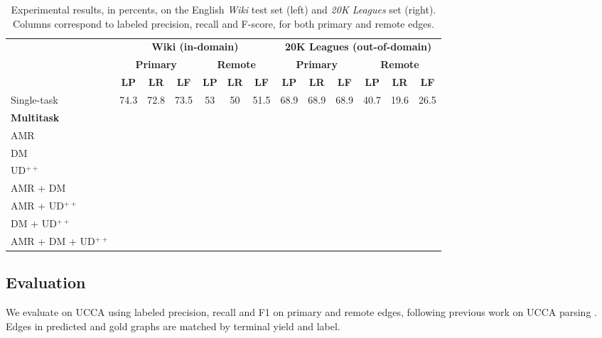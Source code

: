 \documentclass[11pt,a4paper]{article}
\begin{document}
\begin{table*}
\centering
\begin{tabular}{l|ccc|ccc||ccc|ccc}
& \multicolumn{6}{c||}{\footnotesize \bf Wiki (in-domain)}
& \multicolumn{6}{c}{\footnotesize \bf 20K Leagues (out-of-domain)} \\
& \multicolumn{3}{c|}{\footnotesize \bf Primary} & \multicolumn{3}{c||}{\footnotesize \bf Remote}
& \multicolumn{3}{c|}{\footnotesize \bf Primary} & \multicolumn{3}{c}{\footnotesize \bf Remote} \\
& \footnotesize \textbf{LP} & \footnotesize \textbf{LR} & \footnotesize \textbf{LF}
& \footnotesize \textbf{LP} & \footnotesize \textbf{LR} & \footnotesize \textbf{LF}
& \footnotesize \textbf{LP} & \footnotesize \textbf{LR} & \footnotesize \textbf{LF}
& \footnotesize \textbf{LP} & \footnotesize \textbf{LR} & \footnotesize \textbf{LF} \\
\hline
Single-task
& 74.3 & 72.8 & 73.5 & 53 & 50 & 51.5 & 68.9 & 68.9 & 68.9 & 40.7 & 19.6 & 26.5 \\
\hline
\small \bf Multitask &&&&&&&&& \\
AMR \\
DM \\
UD$^{++}$ \\
AMR + DM \\
AMR + UD$^{++}$ \\
DM + UD$^{++}$ \\
AMR + DM + UD$^{++}$ 
\end{tabular}
\caption{
Experimental results, in percents, on the English \textit{Wiki} test set (left)
and \textit{20K Leagues} set (right).
Columns correspond to labeled precision, recall and F-score,
for both primary and remote edges.
}
\label{tab:results}
\end{table*}


\subsection{Evaluation}\label{sec:evaluation}

We evaluate on UCCA using labeled precision, recall and F1 on primary and remote edges,
following previous work on UCCA parsing \cite{hershcovich2017a}.
Edges in predicted and gold graphs are matched by terminal yield and label.
\end{document}
